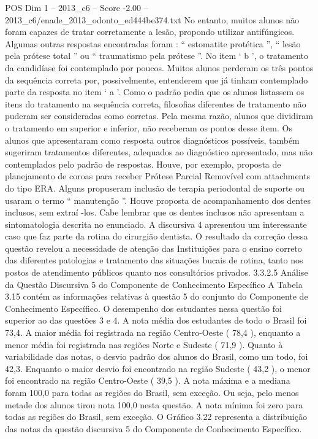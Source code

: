 \begin{textsample}{POS Dim 1 – 2013\_c6 – Score -2.00 – 2013\_c6/enade\_2013\_odonto\_ed444be374.txt}
No entanto, muitos alunos não foram capazes de tratar corretamente a lesão, propondo utilizar antifúngicos.
Algumas outras respostas encontradas foram : “ estomatite protética ”, “ lesão pela prótese total ” ou “ traumatismo pela prótese ”.
No item ‘ b ’, o tratamento da candidíase foi contemplado por poucos.
Muitos alunos perderam os três pontos da sequência correta por, possivelmente, entenderem que já tinham contemplado parte da resposta no item ‘ a ’.
Como o padrão pedia que os alunos listassem os itens do tratamento na sequência correta, filosofias diferentes de tratamento não puderam ser consideradas como corretas.
Pela mesma razão, alunos que dividiram o tratamento em superior e inferior, não receberam os pontos desse item.
Os alunos que apresentaram como resposta outros diagnósticos possíveis, também sugeriram tratamentos diferentes, adequados ao diagnóstico apresentado, mas não contemplados pelo padrão de respostas.
Houve, por exemplo, proposta de planejamento de coroas para receber Prótese Parcial Removível com attachments do tipo ERA.
Alguns propuseram inclusão de terapia periodontal de suporte ou usaram o termo “ manutenção ”.
Houve proposta de acompanhamento dos dentes inclusos, sem extraí -los.
Cabe lembrar que os dentes inclusos não apresentam a sintomatologia descrita no enunciado.
A discursiva 4 apresentou um interessante caso que faz parte da rotina do cirurgião dentista.
O resultado da correção dessa questão revelou a necessidade de atenção das Instituições para o ensino correto das diferentes patologias e tratamento das situações bucais de rotina, tanto nos postos de atendimento públicos quanto nos consultórios privados. 3.3.2.5 Análise da Questão Discursiva 5 do Componente de Conhecimento Específico A Tabela 3.15 contém as informações relativas à questão 5 do conjunto do Componente de Conhecimento Específico.
O desempenho dos estudantes nessa questão foi superior ao das questões 3 e 4.
A nota média dos estudantes de todo o Brasil foi 73,4.
A maior média foi registrada na região Centro-Oeste ( 78,4 ), enquanto a menor média foi registrada nas regiões Norte e Sudeste ( 71,9 ).
Quanto à variabilidade das notas, o desvio padrão dos alunos do Brasil, como um todo, foi 42,3.
Enquanto o maior desvio foi encontrado na região Sudeste ( 43,2 ), o menor foi encontrado na região Centro-Oeste ( 39,5 ).
A nota máxima e a mediana foram 100,0 para todas as regiões do Brasil, sem exceção.
Ou seja, pelo menos metade dos alunos tirou nota 100,0 nesta questão.
A nota mínima foi zero para todas as regiões do Brasil, sem exceção.
O Gráfico 3.22 representa a distribuição das notas da questão discursiva 5 do Componente de Conhecimento Específico.

\end{textsample}
